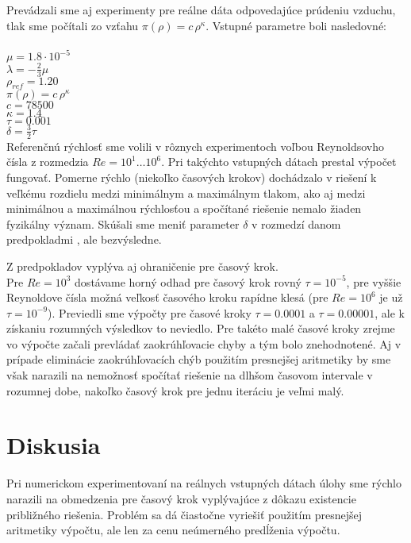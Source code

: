 Prevádzali sme aj experimenty pre reálne dáta odpovedajúce prúdeniu vzduchu,
tlak sme počítali zo vzťahu $\pi(\rho)=c\,\rho^\kappa$. Vstupné parametre boli nasledovné:\\\\
$\mu = 1.8\cdot 10^{-5}$ \\
$\lambda = -\frac{2}{3}\mu$ \\
$\rho_{ref} = 1.20$ \\
$\pi(\rho)=c\,\rho^\kappa$ \\
$c=78500$ \\
$\kappa=1.4$ \\
$\tau = 0.001$ \\
$\delta = \frac{3}{2}\tau$ \\

Referenčnú rýchlosť sme volili v rôznych experimentoch voľbou Reynoldsovho čísla
z rozmedzia $Re=10^1\ldots10^6$. Pri takýchto vstupných dátach prestal výpočet
fungovať. Pomerne rýchlo (niekoľko časových krokov) dochádzalo v riešení k
veľkému rozdielu medzi minimálnym a maximálnym tlakom, ako aj medzi minimálnou a
maximálnou rýchlosťou a spočítané riešenie nemalo žiaden fyzikálny význam.
Skúšali sme meniť parameter $\delta$ v rozmedzí danom predpokladmi
, ale bezvýsledne. 

Z predpokladov  vyplýva aj ohraničenie pre časový
krok.\\ 
Pre $Re=10^3$ dostávame horný odhad pre časový krok rovný $\tau=10^{-5}$,
pre vyššie Reynoldove čísla možná veľkosť časového kroku rapídne klesá (pre
$Re=10^6$ je už $\tau=10^{-9}$). 
Previedli sme výpočty pre časové kroky $\tau=0.0001$ a $\tau=0.00001$, ale k
získaniu rozumných výsledkov to neviedlo.   
Pre takéto malé časové kroky zrejme vo výpočte začali prevládať zaokrúhľovacie
chyby a tým bolo znehodnotené. Aj v prípade eliminácie zaokrúhľovacích chýb
použitím presnejšej aritmetiky by sme však narazili na nemožnosť spočítať
riešenie na dlhšom časovom intervale v rozumnej dobe, nakoľko časový krok pre
jednu iteráciu je veľmi malý.

\chapter{Diskusia}

Pri numerickom experimentovaní na reálnych vstupných dátach úlohy sme rýchlo
narazili na obmedzenia pre časový krok vyplývajúce z dôkazu existencie
približného riešenia. Problém sa dá čiastočne vyriešiť použitím presnejšej
aritmetiky výpočtu, ale len za cenu neúmerného predĺženia výpočtu. 

